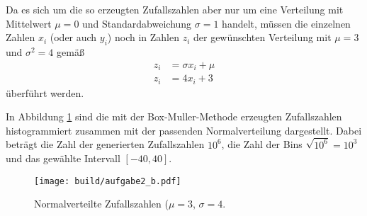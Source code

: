 Da es sich um die so erzeugten Zufallszahlen aber nur um eine Verteilung mit Mittelwert $\mu = 0$ und Standardabweichung $\sigma = 1$ handelt,
müssen die einzelnen Zahlen $x_i$ (oder auch $y_i$) noch in Zahlen $z_i$ der gewünschten Verteilung mit $ \mu = 3$ und $\sigma^2 = 4$ gemäß
\begin{align*}
  z_i &= \sigma x_i + \mu \\
  z_i &= 4 x_i + 3
\end{align*}
überführt werden.

In Abbildung \ref{fig:a2_b} sind die mit der Box-Muller-Methode erzeugten Zufallszahlen histogrammiert zusammen mit der passenden Normalverteilung
dargestellt. Dabei beträgt die Zahl der generierten Zufallszahlen $10^{6}$, die Zahl der Bins $\sqrt{10^6} = 10^3$ und das gewählte Intervall $[-40, 40]$.

\begin{figure}[h]
  \centering
  \texttt{[image: build/aufgabe2\_b.pdf]}
  \caption{Normalverteilte Zufallszahlen ($\mu = 3$, $\sigma = 4$.}
  \label{fig:a2_b}
\end{figure}



